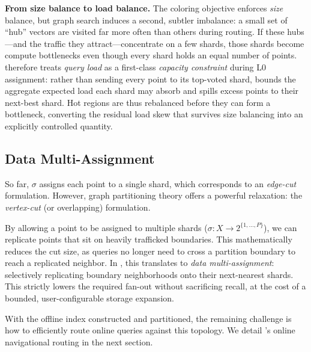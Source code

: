 \noindent\textbf{From size balance to load balance.} The coloring objective enforces \emph{size} balance, but graph search induces a second, subtler imbalance: a small set of ``hub'' vectors are visited far more often than others during routing. If these hubs---and the traffic they attract---concentrate on a few shards, those shards become compute bottlenecks even though every shard holds an equal number of points. \sysname therefore treats \emph{query load} as a first-class \textit{capacity constraint} during L0 assignment: rather than sending every point to its top-voted shard, \sysname bounds the aggregate expected load each shard may absorb and spills excess points to their next-best shard. Hot regions are thus rebalanced before they can form a bottleneck, converting the residual load skew that survives size balancing into an explicitly controlled quantity.

\subsection{Data Multi-Assignment}
So far, $\sigma$ assigns each point to a single shard, which corresponds to an \emph{edge-cut} formulation. However, graph partitioning theory offers a powerful relaxation: the \emph{vertex-cut} (or overlapping) formulation. 

By allowing a point to be assigned to multiple shards ($\sigma:X\to 2^{\{1,\dots,P\}}$), we can replicate points that sit on heavily trafficked boundaries. This mathematically reduces the cut size, as queries no longer need to cross a partition boundary to reach a replicated neighbor. In \sysname, this translates to \emph{data multi-assignment}: selectively replicating boundary neighborhoods onto their next-nearest shards. This strictly lowers the required fan-out without sacrificing recall, at the cost of a bounded, user-configurable storage expansion.

With the offline index constructed and partitioned, the remaining challenge is how to efficiently route online queries against this topology. We detail \sysname's online navigational routing in the next section.

